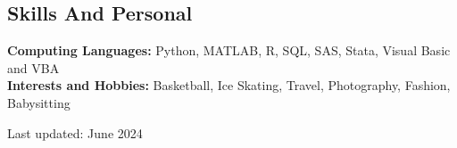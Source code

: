 \documentclass[margin,line]{resume}
\begin{document}
\begin{resume}
    \section{\mysidestyle Skills And Personal}
    \textbf{Computing Languages:} Python, MATLAB, R, SQL, SAS, Stata, Visual Basic and VBA\\
    \textbf{Interests and Hobbies:} Basketball, Ice Skating, Travel, Photography, Fashion, Babysitting


%
%

\hfill 
\scriptsize Last updated: June 2024
\end{resume}   
\end{document}
